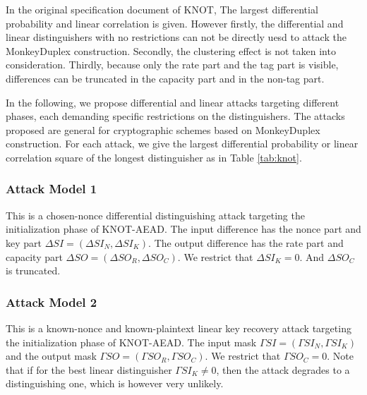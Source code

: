 In the original specification document of KNOT, The largest differential probability and linear correlation is given. However firstly, the differential and linear distinguishers with no restrictions can not be directly uesd to attack the MonkeyDuplex construction. Secondly, the clustering effect is not taken into consideration. Thirdly, because only the rate part and the tag part is visible, differences can be truncated in the capacity part and in the non-tag part. 

In the following, we propose differential and linear attacks targeting different phases, each demanding specific restrictions on the distinguishers. The attacks proposed are general for cryptographic schemes based on MonkeyDuplex construction. For each attack, we give the largest differential probability or linear correlation square of the longest distinguisher as in Table \ref{tab:knot}. 

\subsubsection{Attack Model 1}
This is a chosen-nonce differential distinguishing attack targeting the initialization phase of KNOT-AEAD. The input difference has the nonce part and key part $\Delta SI=(\Delta SI_N,\Delta SI_K)$. The output difference has the rate part and capacity part $\Delta SO=(\Delta SO_R,\Delta SO_C)$. We restrict that $\Delta SI_K=0$. And $\Delta SO_C$ is truncated. 

\subsubsection{Attack Model 2}
This is a known-nonce and known-plaintext linear key recovery attack targeting the initialization phase of KNOT-AEAD. The input mask $\Gamma SI=(\Gamma SI_N,\Gamma SI_K)$ and the output mask $\Gamma SO=(\Gamma SO_R,\Gamma SO_C)$. We restrict that $\Gamma SO_C=0$. Note that if for the best linear distinguisher $\Gamma SI_K\neq 0$, then the attack degrades to a distinguishing one, which is however very unlikely. 



